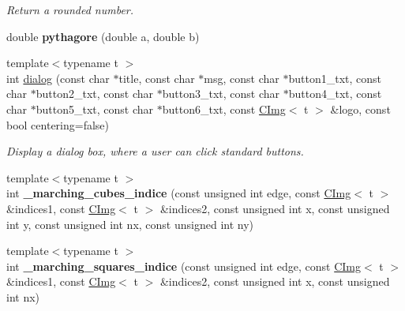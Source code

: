 \begin{DoxyCompactItemize}
\begin{DoxyCompactList}\small\item\em Return a rounded number. \item\end{DoxyCompactList}\item 
\hypertarget{namespacecimg__library_1_1cimg_ac6f5f59fdedf59faef8111b822cb567f}{
double {\bfseries pythagore} (double a, double b)}
\label{namespacecimg__library_1_1cimg_ac6f5f59fdedf59faef8111b822cb567f}

\item 
{\footnotesize template$<$typename t $>$ }\\int \hyperlink{namespacecimg__library_1_1cimg_a9bd2a1e3ffff4538c4f53856e8b28ded}{dialog} (const char $\ast$title, const char $\ast$msg, const char $\ast$button1\_\-txt, const char $\ast$button2\_\-txt, const char $\ast$button3\_\-txt, const char $\ast$button4\_\-txt, const char $\ast$button5\_\-txt, const char $\ast$button6\_\-txt, const \hyperlink{structcimg__library_1_1_c_img}{CImg}$<$ t $>$ \&logo, const bool centering=false)
\begin{DoxyCompactList}\small\item\em Display a dialog box, where a user can click standard buttons. \item\end{DoxyCompactList}\item 
\hypertarget{namespacecimg__library_1_1cimg_a937cd30be3d03718edb3f1957d2c5de1}{
{\footnotesize template$<$typename t $>$ }\\int {\bfseries \_\-marching\_\-cubes\_\-indice} (const unsigned int edge, const \hyperlink{structcimg__library_1_1_c_img}{CImg}$<$ t $>$ \&indices1, const \hyperlink{structcimg__library_1_1_c_img}{CImg}$<$ t $>$ \&indices2, const unsigned int x, const unsigned int y, const unsigned int nx, const unsigned int ny)}
\label{namespacecimg__library_1_1cimg_a937cd30be3d03718edb3f1957d2c5de1}

\item 
\hypertarget{namespacecimg__library_1_1cimg_afd143ebf74cce811d156357872c56fd4}{
{\footnotesize template$<$typename t $>$ }\\int {\bfseries \_\-marching\_\-squares\_\-indice} (const unsigned int edge, const \hyperlink{structcimg__library_1_1_c_img}{CImg}$<$ t $>$ \&indices1, const \hyperlink{structcimg__library_1_1_c_img}{CImg}$<$ t $>$ \&indices2, const unsigned int x, const unsigned int nx)}
\label{namespacecimg__library_1_1cimg_afd143ebf74cce811d156357872c56fd4}

\end{DoxyCompactItemize}
